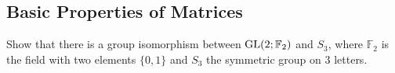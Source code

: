 \subsection{Basic Properties of Matrices}
\item Show that there is a group isomorphism between $\text{GL}(2; \mathbb{F}_{2})$ and $S_{3}$, where $\mathbb{F}_{2}$ is the field with two elements $\{0, 1\}$ and $S_{3}$ the symmetric group on 3 letters.

